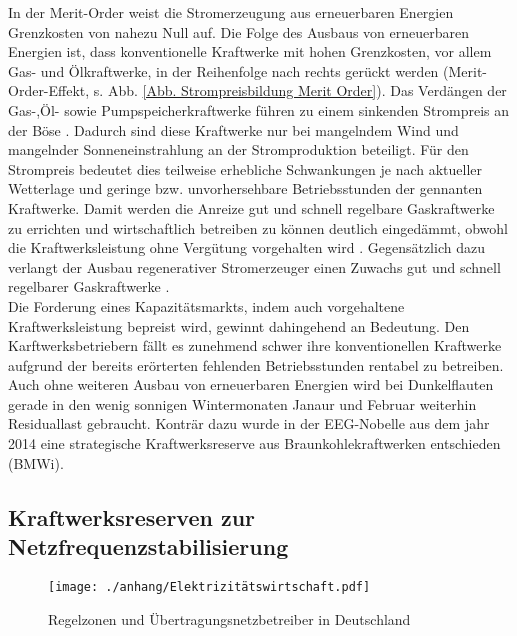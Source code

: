 		In der Merit-Order weist die Stromerzeugung aus erneuerbaren Energien Grenzkosten von nahezu Null auf.
		Die Folge des Ausbaus von erneuerbaren Energien ist, dass konventionelle Kraftwerke mit hohen Grenzkosten, vor allem Gas- und Ölkraftwerke, in der Reihenfolge nach rechts gerückt werden (Merit-Order-Effekt, s. Abb. \ref{Abb. Strompreisbildung Merit Order}).
		Das Verdängen der Gas-,Öl- sowie Pumpspeicherkraftwerke führen zu einem sinkenden Strompreis an der Böse \parencite{Frauenhofer_PV_Bericht}.
		Dadurch sind diese Kraftwerke nur bei mangelndem Wind und mangelnder Sonneneinstrahlung an der Stromproduktion beteiligt.
		Für den Strompreis bedeutet dies teilweise erhebliche Schwankungen je nach aktueller Wetterlage und geringe bzw. unvorhersehbare Betriebsstunden der gennanten Kraftwerke. 
		Damit werden die Anreize gut und schnell regelbare Gaskraftwerke zu errichten und wirtschaftlich betreiben zu können deutlich eingedämmt, obwohl die Kraftwerksleistung ohne Vergütung vorgehalten wird \parencite{Frauenhofer_PV_Bericht}.
		Gegensätzlich dazu verlangt der Ausbau regenerativer Stromerzeuger einen Zuwachs gut und schnell regelbarer Gaskraftwerke \parencite{Doktorarbeit_Reitsam}. \\
		
		Die Forderung eines Kapazitätsmarkts, indem auch vorgehaltene Kraftwerksleistung bepreist wird, gewinnt dahingehend an Bedeutung.
		Den Karftwerksbetriebern fällt es zunehmend schwer ihre konventionellen Kraftwerke aufgrund der bereits erörterten fehlenden Betriebsstunden rentabel zu betreiben.
		Auch ohne weiteren Ausbau von erneuerbaren Energien wird bei Dunkelflauten gerade in den wenig sonnigen Wintermonaten Janaur und Februar weiterhin Residuallast gebraucht.
		Konträr dazu wurde in der EEG-Nobelle aus dem jahr 2014 eine strategische Kraftwerksreserve aus Braunkohlekraftwerken entschieden (BMWi).		
				
	\subsection{Kraftwerksreserven zur Netzfrequenzstabilisierung}
	
		\begin{wrapfigure}{r}{0.5\textwidth}
			\centering
			\texttt{[image: ./anhang/Elektrizitätswirtschaft.pdf]}
			\caption{Regelzonen und Übertragungsnetzbetreiber in Deutschland \parencite{Elektrizitätswirtschaft}}
			\label{Abb. Regelzonen Deutschland}
		\end{wrapfigure}
	
